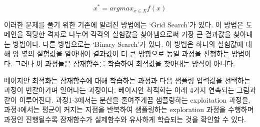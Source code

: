 \documentclass[a4paper]{oblivoir}
\begin{document}
\begin{equation}
x^{*} = argmax_{x \in X}f(x)
\label{eq:12-37}
\end{equation}

이러한 문제를 풀기 위한 기존에 알려진 방법에는 ‘Grid Search’가 있다. 이 방법은 도메인을 적당한 격자로 나누어 각각의 실험값을 찾아냄으로써 가장 큰 결과값을 찾아내는 방법이다. 다른 방법으로는 ‘Binary Search’가 있다. 이 방법은 하나의 실험값에 대해 양 옆의 실험값을 알아내어 결과값이 더 큰 방향으로 동일 과정을 진행하는 방법이다. 그러나 이 과정들은 잠재함수를 학습하여 최적값을 찾아내는 방식이 아니다.

베이지안 최적화는 잠재함수에 대해 학습하는 과정과 다음 샘플링 입력값을 선택하는 과정이 번갈아가며 일어나는 과정이다. 베이시안 최적화는 아래 4가지 연속되는 그림과 같이 이루어진다. 과정1-3에서는 분산을 줄여주게끔 샘플링하는 exploitation 과정을, 과정4에서는 평균이 커지는 지점을 반복하여 샘플링하는 exploration 과정을 수행하며 과정인 진행될수록 잠재함수가 실제함수와 유사하게 학습되는 것을 확인할 수 있다.\\
\end{document}
